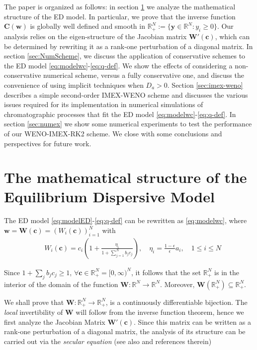 \documentclass[preprint]{elsarticle}
\theoremstyle{definition}
\def\rpn{\mathbb{R}_+^N}
\newcommand{\bw}{\boldsymbol w}
\newcommand{\bW}{\boldsymbol W}
\newcommand{\bc}{\boldsymbol c}
\begin{document}
The paper is organized as follows: in section \ref{sec:Modeleq} we analyze the
mathematical structure of the ED model.  In particular, we prove that
the inverse function $\boldsymbol{C}(\boldsymbol{w})$ is globally well
defined and smooth in $\rpn:=\lbrace \boldsymbol{y}\in\mathbb R^N
  \colon y_i\geq 0\rbrace$.
Our analysis relies on the eigen-structure of the Jacobian matrix
$\bW'(\bc)$, which can be determined by
rewriting it as a rank-one perturbation of a diagonal matrix.  
In section \ref{sec:NumScheme}, 
we discuss the application of conservative schemes to the ED model
\eqref{eq:modelwc}-\eqref{eq:q-def}. We
show the effects of considering a non-conservative numerical scheme,
versus a fully conservative one, and discuss the convenience of using
implicit techniques when $D_a>0$. Section \ref{sec:imex-weno} describes  a simple second-order
IMEX-WENO scheme and discusses the various issues required for its
implementation in  numerical simulations of
chromatographic processes that fit the ED model
\eqref{eq:modelwc}-\eqref{eq:q-def}. In section \ref{sec:numex} we show some
numerical experiments to test the performance  of our WENO-IMEX-RK2
scheme. We close with some conclusions and perspectives for future work.



\section{The mathematical structure of the Equilibrium Dispersive Model}
\label{sec:Modeleq}



The ED model
\eqref{eq:modelED}-\eqref{eq:q-def} can be rewritten as
\eqref{eq:modelwc}, where  $\bw= \bW(\bc)=(W_i(\bc))_{i=1}^N$
with \begin{equation}\label{eq:definitionw}
  \begin{aligned}
    & \ W_i
    (\bc)= c_i \left( 1+\frac{\eta_i}{1+\sum_{j=1}^N b_j c_j} \right),
    \quad \eta_i=\frac{1-\epsilon}{\epsilon}a_i, \quad 1 \leq i\leq N
\end{aligned}
\end{equation}

Since $1+\sum_j b_j c_j \geq 1$, $\forall \bc \in \mathbb
R_+^N=[0,\infty)^N$, it follows that 
 the set $\mathbb R_+^N $ is in the interior
 of the 
 domain of the function $\boldsymbol{W}\colon \mathbb R^N \to
 \mathbb  R^N$. Moreover,  $\bW(\mathbb
R_+^N)\subseteq \mathbb R_+^N$.

We shall prove that  
$\boldsymbol{W}\colon \mathbb R_+^N \to  \mathbb  R_+^N$, 
is a continuously differentiable bijection.   The  {\em local } invertibility of
$\boldsymbol{W}$ will follow from the inverse function theorem, hence
we first analyze the Jacobian Matrix $\bW'(\bc)$. 
Since  this matrix can be written as a rank-one
perturbation of a diagonal matrix, the analysis of its structure can
be carried out via the {\em secular equation} (see also \cite{Donat3} and
references therein)
\end{document}
